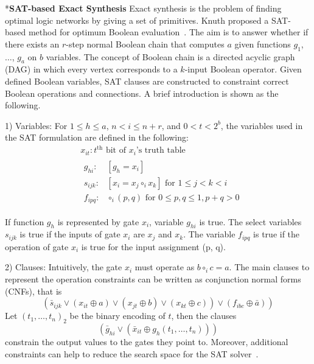 \documentclass[conference,letterpaper]{IEEEtran}
\makeatletter
\renewcommand{\subsection}{\@startsection{subsection}{1}{0mm}
	{-\baselineskip}{0.001\baselineskip}{\bf\leftline}}
\makeatother
\begin{document}
\subsection*{\textbf{SAT-based Exact Synthesis}}
Exact synthesis is the problem of finding optimal logic networks by giving a set of primitives.
Knuth proposed a SAT-based method for optimum Boolean evaluation~\cite{knuth}. 
The aim is to answer whether if there exists an $r$-step normal Boolean chain that computes $a$ given functions $g_1$, $\ldots$, $g_a$ on $b$ variables. The concept of Boolean chain is a directed acyclic graph (DAG) in which every vertex corresponds to a $k$-input Boolean operator. 
Given defined Boolean variables, SAT clauses are constructed to constraint correct Boolean operations and connections.
A brief introduction is shown as the following. 

1) Variables: For $1 \leq h \leq a$, $n<i \leq n+r$, and $0<t<2^{b}$, the variables used in the SAT formulation are defined in the following:
\begin{equation}
\begin{aligned}
 &x_{i t}: t^{\mathrm{th}} \text { bit of } x_{i} \text{'s truth table }\\
&\begin{aligned}
g_{h i}: &\left[g_{h}=x_{i}\right] \\
s_{i j k}: &\left[x_{i}=x_{j} \circ_{i} x_{k}\right] \text { for } 1 \leq j<k<i \\
f_{i p q}: & \circ_{i}(p, q) \text { for } 0 \leq p, q \leq 1, p+q>0
\end{aligned}
\end{aligned}
\end{equation}

If function $g_{h}$ is represented by gate $x_{i}$, variable $g_{hi}$ is true. The select variables $s_{ijk}$ is true if the inputs of gate $x_{i}$ are $x_{j}$ and $x_{k}$. The variable $f_{ipq}$ is true if the operation of gate $x_{i}$ is true for the input assignment (p, q).

2) Clauses: Intuitively, the gate $x_{i}$ must operate as $b \circ_{i} c=a$.  The main clauses to represent the operation constraints can be written as conjunction normal forms (CNFs), that is
\begin{equation}
\left.\left(\bar{s}_{i j k} \vee\left(x_{i t} \oplus a\right) \vee\left(x_{j t} \oplus b\right) \vee\left(x_{k t} \oplus c\right)\right) \vee\left(f_{i b c} \oplus \bar{a}\right)\right)
\end{equation}
Let $\left(t_{1}, \ldots, t_{n}\right)_{2}$ be the binary encoding of $t$, then the clauses
\begin{equation}
\left(\bar{g}_{h i} \vee\left(\bar{x}_{i t} \oplus g_{h}\left(t_{1}, \ldots, t_{n}\right)\right)\right)
\end{equation}
constrain the output values to the gates they point to. Moreover, additional constraints can help to reduce the search space for the SAT solver~\cite{knuth}. %
\end{document}
